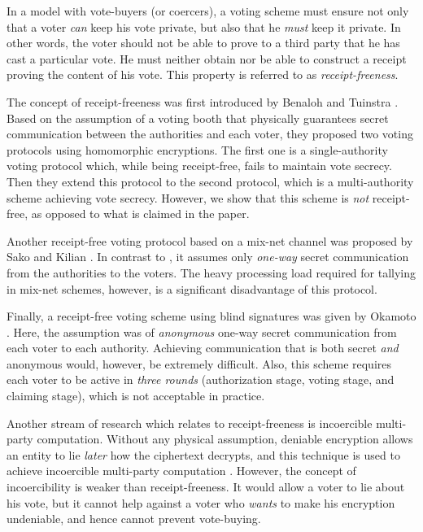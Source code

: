 \documentclass{article}
\begin{document}
In a model with vote-buyers (or coercers), a voting scheme must ensure not
only that a voter {\em can\/} keep his vote private, but also that he
{\em must\/} keep it private. In other words, the voter should not be
able to prove to a third party that he has cast a particular vote. He must
neither obtain nor be able to construct a receipt proving the content of
his vote. This property is referred to as {\em receipt-freeness\/}.

The concept of receipt-freeness was first introduced by Benaloh and
Tuinstra \cite{BT94}. Based on the assumption of a voting booth that
physically guarantees
secret communication between the authorities and each voter,
they proposed two voting protocols using homomorphic
encryptions.  The first one is a single-authority voting protocol which,
while being receipt-free, fails to maintain vote secrecy.  Then they extend
this protocol to the second protocol, which is a multi-authority scheme
achieving vote secrecy.  However, we show that this scheme is {\em not\/}
receipt-free, as opposed to what is claimed in the paper.

Another receipt-free voting protocol based on a mix-net channel was
proposed by Sako and Kilian \cite{SK95}. In contrast to \cite{BT94}, it
assumes only {\em one-way\/} secret communication from the authorities to
the voters. The heavy processing load required for tallying in mix-net
schemes, however, is a significant disadvantage of this protocol.

Finally, a receipt-free voting scheme using blind signatures was given by
Okamoto \cite{Oka97}. Here, the assumption was of {\em anonymous\/} one-way
secret communication from each voter to each authority. Achieving
communication that is both secret {\em and\/} anonymous would, however, be
extremely difficult. Also, this scheme requires each voter to be active in
{\em three rounds\/} (authorization stage, voting stage, and claiming
stage), which is not acceptable in practice.

Another stream of research which relates to receipt-freeness is incoercible
multi-party computation. Without any physical assumption, deniable
encryption \cite{CDNO97} allows an entity to lie {\em later\/} how the
ciphertext decrypts, and this technique is used to achieve incoercible
multi-party computation \cite{CG96}. However, the concept of incoercibility
is weaker than receipt-freeness. It would allow a voter to lie about his
vote, but it cannot help against a voter who {\em wants\/} to make his
encryption undeniable, and hence cannot prevent vote-buying.
\end{document}
